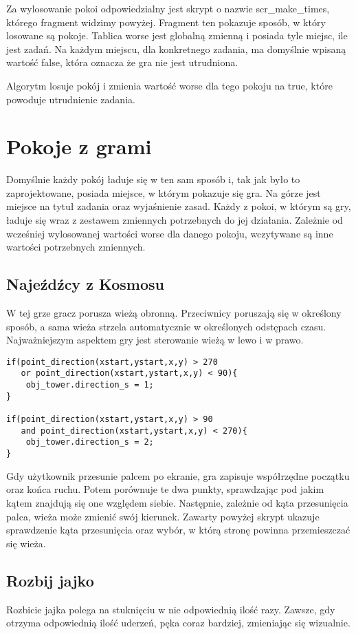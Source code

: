 \documentclass[openright]{xmgr}
\begin{document}
Za wylosowanie pokoi odpowiedzialny jest skrypt o nazwie scr\_make\_times, którego fragment widzimy powyżej. Fragment ten pokazuje sposób, w który losowane są pokoje. Tablica worse jest globalną zmienną i posiada tyle miejsc, ile jest zadań. Na każdym miejscu, dla konkretnego zadania, ma domyślnie wpisaną wartość false, która oznacza że gra nie jest utrudniona.

Algorytm losuje pokój i zmienia wartość worse dla tego pokoju na true, które powoduje utrudnienie zadania.


\section{Pokoje z grami}
Domyślnie każdy pokój ładuje się w ten sam sposób i, tak jak było to zaprojektowane, posiada miejsce, w którym pokazuje się gra. Na górze jest miejsce na tytuł zadania oraz wyjaśnienie zasad. Każdy z pokoi, w którym są gry, ładuje się wraz z zestawem zmiennych potrzebnych do jej działania. Zależnie od wcześniej wylosowanej wartości worse dla danego pokoju, wczytywane są inne wartości potrzebnych zmiennych.

\subsection{Najeźdźcy z Kosmosu}
W tej grze gracz porusza wieżą obronną. Przeciwnicy poruszają się w określony
sposób, a sama wieża strzela automatycznie w określonych odstępach czasu. Najważniejszym aspektem gry jest sterowanie wieżą w lewo i w prawo.

\begin{lstlisting}[caption={Skrypt scr\_direction}]
if(point_direction(xstart,ystart,x,y) > 270 
   or point_direction(xstart,ystart,x,y) < 90){
    obj_tower.direction_s = 1;
}

if(point_direction(xstart,ystart,x,y) > 90 
   and point_direction(xstart,ystart,x,y) < 270){
    obj_tower.direction_s = 2;
}
\end{lstlisting}

Gdy użytkownik przesunie palcem po ekranie, gra zapisuje współrzędne
początku oraz końca ruchu. Potem porównuje te dwa punkty, sprawdzając
pod jakim kątem znajdują się one względem siebie. Następnie, zależnie od kąta przesunięcia palca, wieża może zmienić swój kierunek. Zawarty powyżej skrypt
ukazuje sprawdzenie kąta przesunięcia oraz wybór, w którą stronę powinna
przemieszczać się wieża.

\subsection{Rozbij jajko}
Rozbicie jajka polega na stuknięciu w nie odpowiednią ilość razy. Zawsze, gdy otrzyma odpowiednią ilość uderzeń, pęka coraz bardziej, zmieniając się wizualnie.
\end{document}
